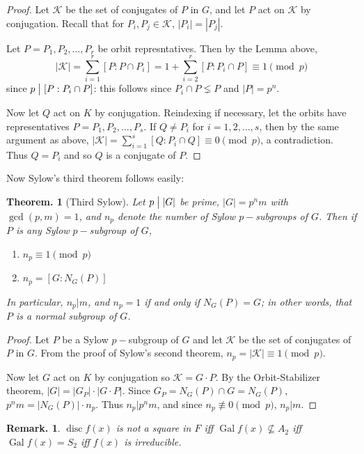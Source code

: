 \documentclass[11pt, a4paper]{memoir}
\renewcommand{\div}{\bigm|}
\theoremstyle{change}
\newtheorem{theorem}{Theorem.}[section]
\theoremstyle{plain}
\theoremstyle{nonumberplain}
\newtheorem{remark}{Remark.}
\newtheorem{proof}{Proof}
\DeclareMathOperator{\disc}{disc}
\DeclareMathOperator{\Gal}{Gal}
\numberwithin{equation}{section}
\begin{document}
\begin{proof}
    Let $\mathcal{K}$ be the set of conjugates of $P$ in $G$, and let $P$ act on $\mathcal{K}$ by conjugation.
    Recall that for $P_i,P_j\in\mathcal{K}$, $|P_i|=|P_j|$.

    Let $P=P_1,P_2,\ldots,P_r$ be orbit represntatives.
    Then by the Lemma above,
    \begin{equation*}
        |\mathcal{K}|=\sum_{i=1}^r[P:P\cap P_i]=1+\sum\limits_{i=2}^r[P:P_i\cap P]\equiv 1\pmod{p}
    \end{equation*}
    since $p\div[P:P_i\cap P]$: this follows since $P_i\cap P\lneq P$ and $|P|=p^n$.

    Now let $Q$ act on $K$ by conjugation.
    Reindexing if necessary, let the orbits have representatives $P=P_1,P_2,\ldots,P_s$.
    If $Q\neq P_i$ for $i=1,2,\ldots,s$, then by the same argument as above, $|\mathcal{K}|=\sum_{i=1}^s[Q:P_i\cap Q]\equiv 0\pmod{p}$, a contradiction.
    Thus $Q=P_i$ and so $Q$ is a conjugate of $P$.
\end{proof}
Now Sylow's third theorem follows easily:
\begin{theorem}[Third Sylow]
    Let $p\div|G|$ be prime, $|G|=p^nm$ with $\gcd(p,m)=1$, and $n_p$ denote the number of Sylow $p-$subgroups of $G$.
    Then if $P$ is any Sylow $p-$subgroup of $G$,
    \begin{enumerate}[nolistsep]
        \item $n_p\equiv 1\pmod{p}$
        \item $n_p=[G:N_G(P)]$
    \end{enumerate}
    In particular, $n_p|m$, and $n_p=1$ if and only if $N_G(P)=G$; in other words, that $P$ is a normal subgroup of $G$.
\end{theorem}
\begin{proof}
    Let $P$ be a Sylow $p-$subgroup of $G$ and let $\mathcal{K}$ be the set of conjugates of $P$ in $G$.
    From the proof of Sylow's second theorem, $n_p=|\mathcal{K}|\equiv 1\pmod{p}$.

    Now let $G$ act on $K$ by conjugation so $\mathcal{K}=G\cdot P$.
    By the Orbit-Stabilizer theorem, $|G|=|G_P|\cdot|G\cdot P|$.
    Since $G_P=N_G(P)\cap G=N_G(P)$, $p^nm=|N_G(P)|\cdot n_p$.
    Thus $n_p|p^nm$, and since $n_p\nequiv 0\pmod{p}$, $n_p|m$.
\end{proof}
\begin{remark}
    $\disc f(x)$ is not a square in $F$ iff $\Gal f(x)\nsubseteq A_2$ iff $\Gal f(x)=S_2$ iff $f(x)$ is irreducible.
\end{remark}
\end{document}
